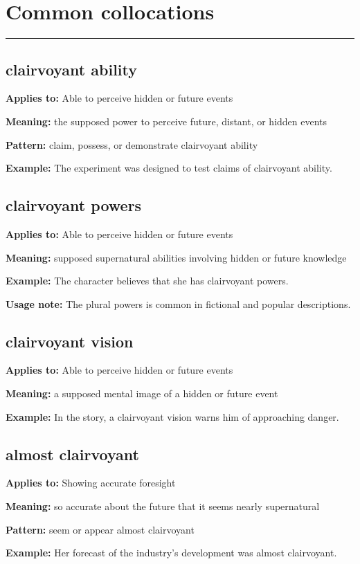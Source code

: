 \documentclass[11pt]{article}
\newcommand{\sectionrule}{\par\vspace{-0.5em}\noindent\textcolor{Accent}{\rule{\linewidth}{0.6pt}}\par}
\begin{document}
\section{Common collocations}
\sectionrule
\subsection{clairvoyant ability}
\textbf{Applies to:} Able to perceive hidden or future events

\textbf{Meaning:} the supposed power to perceive future, distant, or hidden events

\textbf{Pattern:} claim, possess, or demonstrate clairvoyant ability

\textbf{Example:} The experiment was designed to test claims of clairvoyant ability.

\subsection{clairvoyant powers}
\textbf{Applies to:} Able to perceive hidden or future events

\textbf{Meaning:} supposed supernatural abilities involving hidden or future knowledge

\textbf{Example:} The character believes that she has clairvoyant powers.

\textbf{Usage note:} The plural powers is common in fictional and popular descriptions.

\subsection{clairvoyant vision}
\textbf{Applies to:} Able to perceive hidden or future events

\textbf{Meaning:} a supposed mental image of a hidden or future event

\textbf{Example:} In the story, a clairvoyant vision warns him of approaching danger.

\subsection{almost clairvoyant}
\textbf{Applies to:} Showing accurate foresight

\textbf{Meaning:} so accurate about the future that it seems nearly supernatural

\textbf{Pattern:} seem or appear almost clairvoyant

\textbf{Example:} Her forecast of the industry's development was almost clairvoyant.
\end{document}
